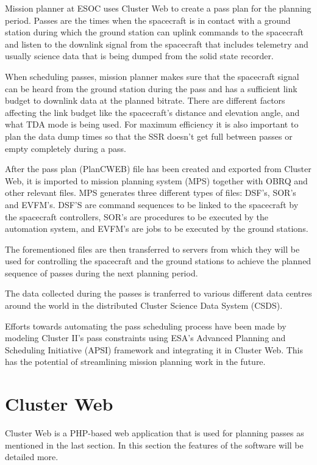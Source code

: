 Mission planner at ESOC uses Cluster Web to create a pass plan for the planning period. Passes are the times when the spacecraft is in contact with a ground station during which the ground station can uplink commands to the spacecraft and listen to the downlink signal from the spacecraft that includes telemetry and usually science data that is being dumped from the solid state recorder.

When scheduling passes, mission planner makes sure that the spacecraft signal can be heard from the ground station during the pass and has a sufficient link budget to downlink data at the planned bitrate. There are different factors affecting the link budget like the spacecraft's distance and elevation angle, and what TDA mode is being used. For maximum efficiency it is also important to plan the data dump times so that the SSR doesn't get full between passes or empty completely during a pass.

After the pass plan (PlanCWEB) file has been created and exported from Cluster Web, it is imported to mission planning system (MPS) together with OBRQ and other relevant files. MPS generates three different types of files: DSF's, SOR's and EVFM's. DSF'S are command sequences to be linked to the spacecraft  by the spacecraft controllers, SOR's are procedures to be executed by the automation system, and EVFM's are jobs to be executed by the ground stations.

The forementioned files are then transferred to servers from which they will be used for controlling the spacecraft and the ground stations to achieve the planned sequence of passes during the next planning period.

The data collected during the passes is tranferred to various different data centres around the world in the distributed Cluster Science Data System (CSDS).

Efforts towards automating the pass scheduling process have been made by modeling Cluster II's pass constraints using ESA's Advanced Planning and Scheduling Initiative (APSI) framework and integrating it in Cluster Web. This has the potential of streamlining mission planning work in the future. \cite{farber2016automation}

\cite{esasci, esacluster}

\section{Cluster Web}\label{clusterweb_section}
Cluster Web is a PHP-based web application that is used for planning passes as mentioned in the last section. In this section the features of the software will be detailed more.

